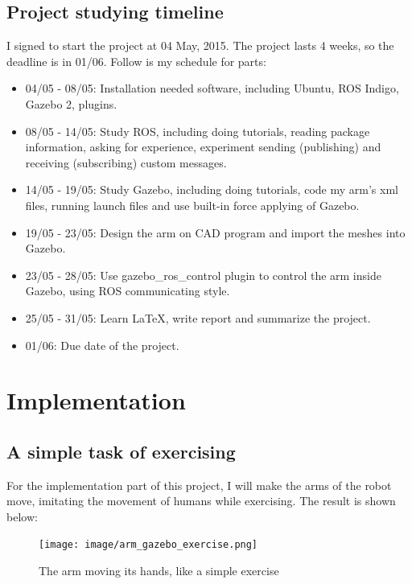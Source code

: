 \documentclass[pdftex,12pt,a4paper]{article}
\begin{document}
  \subsection{Project studying timeline}
  I signed to start the project at 04 May, 2015. The project lasts 4 weeks, so the deadline is in 01/06. Follow is my schedule for parts:
  \begin{itemize}
  \item 04/05 - 08/05: Installation needed software, including Ubuntu, ROS Indigo, Gazebo 2, plugins.
  \item 08/05 - 14/05: Study ROS, including doing tutorials, reading package information, asking for experience, experiment sending (publishing) and receiving (subscribing) custom messages.
  \item 14/05 - 19/05: Study Gazebo, including doing tutorials, code my arm's xml files, running launch files and use built-in force applying of Gazebo.
  \item 19/05 - 23/05: Design the arm on CAD program and import the meshes into Gazebo.
  \item 23/05 - 28/05: Use gazebo\_ros\_control plugin to control the arm inside Gazebo, using ROS communicating style.
  \item 25/05 - 31/05: Learn LaTeX, write report and summarize the project.
  \item 01/06: Due date of the project.
  \end{itemize}
  
  \newpage
  \section{Implementation}
  \subsection{A simple task of exercising}
  For the implementation part of this project, I will make the arms of the robot move, imitating the movement of humans while exercising. The result is shown below:
  \begin{figure}[h]
      \centering
      \texttt{[image: image/arm\_gazebo\_exercise.png]}
      \caption{The arm moving its hands, like a simple exercise}
      \label{fig:arm_exercise}
  \end{figure}
    
  \newpage
\end{document}
